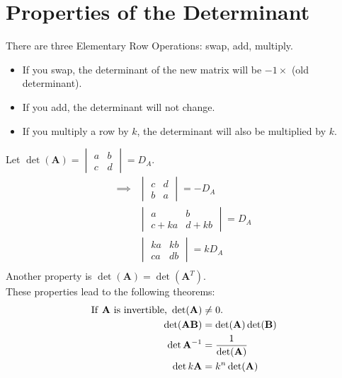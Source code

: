 \documentclass[nobib]{tufte-handout}
\begin{document}
\section{Properties of the Determinant}
There are three Elementary Row Operations: swap, add, multiply.
\begin{itemize}
    \item If you swap, the determinant of the new matrix will be $-1\times$ (old
          determinant).
    \item If you add, the determinant will not change.
    \item If you multiply a row by $k$, the determinant will also be multiplied by $k$.
\end{itemize}
Let $\det(\mathbf{A})=\begin{vmatrix}a & b\\ c & d\end{vmatrix} = D_A$.\\
\begin{align*}
    \implies & \begin{vmatrix}c & d\\ b & a\end{vmatrix} = -D_A      \\
             & \begin{vmatrix}a & b\\ c+ka & d+kb\end{vmatrix} = D_A \\
             & \begin{vmatrix}ka & kb\\ ca & db\end{vmatrix} = kD_A  \\
\end{align*}
Another property is $\det(\mathbf{A}) = \det(\mathbf{A}^T)$.\\
These properties lead to the following theorems:\\
\begin{align*}
    \text{If \textbf{A} is invertible, }\det(\mathbf{A}) & \neq 0.                            \\
    \det(\mathbf{AB})                                    & = \det(\mathbf{A})\det(\mathbf{B}) \\
    \det{\mathbf{A}}^{-1}                                & = \frac{1}{\det(\mathbf{A})}       \\
    \det{k\mathbf{A}}                                    & = k^n\det(\mathbf{A})
\end{align*}
\end{document}
